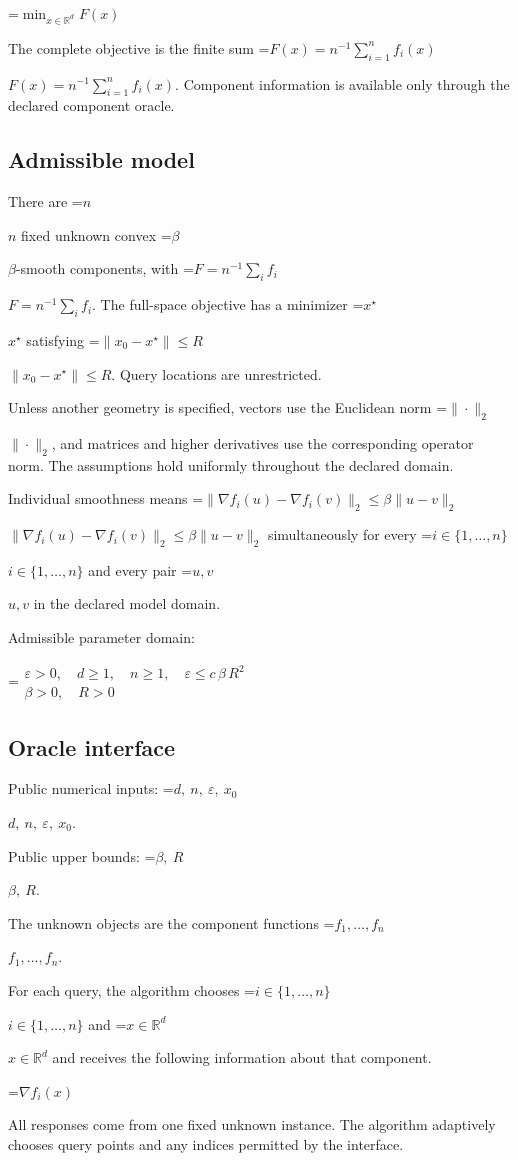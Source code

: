 \documentclass[10pt,a4paper]{article}
\newcommand{\AtlasMath}[1]{\par\begingroup\centering\setbox0=\hbox{$\displaystyle #1$}\ifdim\wd0>1.4\linewidth\typeout{ATLAS WIDE FORMULA: \the\wd0}\fi\ifdim\wd0>\linewidth\resizebox{\linewidth}{!}{\box0}\else\box0\fi\par\endgroup}
\newcommand{\AtlasInlineMath}[1]{\begingroup\setbox0=\hbox{$#1$}\ifdim\wd0>.4\linewidth\endgroup\AtlasMath{#1}\else\endgroup$#1$\fi}
\begin{document}
\AtlasMath{\min_{x\in \mathbb{R}^d}F(x)}


The complete objective is the finite sum \AtlasInlineMath{F(x)=n^{-1}\sum_{i=1}^n f_i(x)}. Component information is available only through the declared component oracle.

\subsection{Admissible model}
There are \AtlasInlineMath{n} fixed unknown convex \AtlasInlineMath{\beta}-smooth components, with \AtlasInlineMath{F=n^{-1}\sum_i f_i}. The full-space objective has a minimizer \AtlasInlineMath{x^\star} satisfying \AtlasInlineMath{\|x_0-x^\star\|\le R}. Query locations are unrestricted.

Unless another geometry is specified, vectors use the Euclidean norm \AtlasInlineMath{\|\cdot\|_2}, and matrices and higher derivatives use the corresponding operator norm. The assumptions hold uniformly throughout the declared domain.

Individual smoothness means \AtlasInlineMath{\|\nabla f_i(u)-\nabla f_i(v)\|_2\le\beta\|u-v\|_2} simultaneously for every \AtlasInlineMath{i\in\{1,\ldots,n\}} and every pair \AtlasInlineMath{u,v} in the declared model domain.

Admissible parameter domain:


\AtlasMath{\begin{gathered}\varepsilon > 0,\quad d \ge 1,\quad n \ge 1,\quad \varepsilon \le c\,\beta\,{R}^{2}\\\beta > 0,\quad R > 0\end{gathered}}


\subsection{Oracle interface}
Public numerical inputs: \AtlasInlineMath{d,\ n,\ \varepsilon,\ x_0}.

Public upper bounds: \AtlasInlineMath{\beta,\ R}.

The unknown objects are the component functions \AtlasInlineMath{f_1,\ldots,f_n}.

For each query, the algorithm chooses \AtlasInlineMath{i\in\{1,\ldots,n\}} and \AtlasInlineMath{x\in\mathbb R^d} and receives the following information about that component.


\AtlasMath{\nabla f_i(x)}


All responses come from one fixed unknown instance. The algorithm adaptively chooses query points and any indices permitted by the interface.
\end{document}
